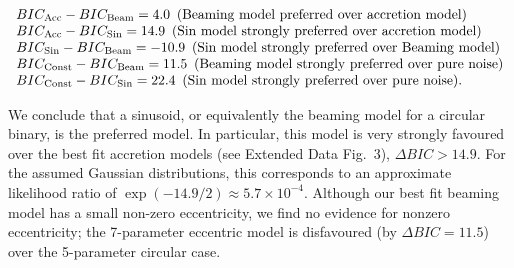 \begin{center}
\vspace{-\baselineskip}
$\begin{array} {l l}
%
%
%
   BIC_{\rm Acc} - BIC_{\rm Beam} = 4.0 \,\,\, {\rm (Beaming~model~preferred~over~accretion~model)} \\  %
%
  BIC_{\rm Acc} - BIC_{\rm Sin} = 14.9 \,\,\, {\rm (Sin~model~strongly~preferred~over~accretion~model)} \\ %
%
  BIC_{\rm Sin} - BIC_{\rm Beam} = -10.9  \,\,\, {\rm (Sin~model~strongly~preferred~over~Beaming~model)}  \\ %
%
  BIC_{\rm Const} - BIC_{\rm Beam} = 11.5   \,\,\, {\rm (Beaming~model~strongly~preferred~over~pure~noise)} \\ %
  BIC_{\rm Const} - BIC_{\rm Sin} = 22.4 \,\,\, {\rm (Sin~model~strongly~preferred~over~pure~noise)}. %
\end{array}$
\end{center} 

\vspace{-\baselineskip} We conclude that a sinusoid, or equivalently
the beaming model for a circular binary, is the preferred model.  In
particular, this model is very strongly favoured over the best fit
accretion models (see Extended Data Fig.~3), %
$\Delta BIC>14.9$. For the assumed Gaussian distributions, this
corresponds to an approximate likelihood ratio of
$\exp(-14.9/2)\approx 5.7\times 10^{-4}$.
Although our best fit beaming model has a small non-zero eccentricity, we find no evidence
for nonzero eccentricity; the 7-parameter eccentric model is
disfavoured (by $\Delta BIC=11.5$) over the 5-parameter circular case.

